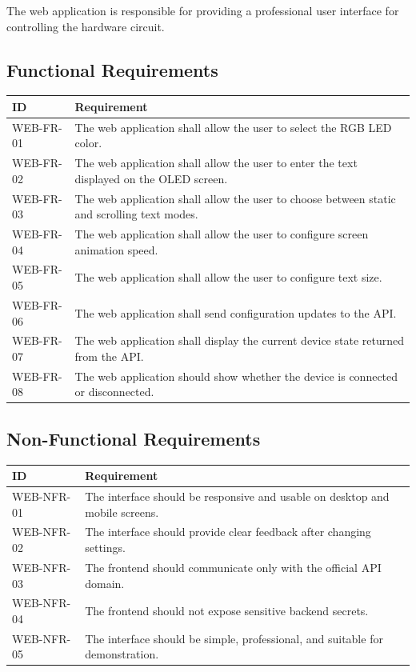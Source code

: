\documentclass[12pt,a4paper]{report}
\begin{document}
The web application is responsible for providing a professional user interface for controlling the hardware circuit.

\subsection{Functional Requirements}

\begin{longtable}{p{2.5cm} p{11cm}}
\toprule
\textbf{ID} & \textbf{Requirement} \\
\midrule
WEB-FR-01 & The web application shall allow the user to select the RGB LED color. \\
WEB-FR-02 & The web application shall allow the user to enter the text displayed on the OLED screen. \\
WEB-FR-03 & The web application shall allow the user to choose between static and scrolling text modes. \\
WEB-FR-04 & The web application shall allow the user to configure screen animation speed. \\
WEB-FR-05 & The web application shall allow the user to configure text size. \\
WEB-FR-06 & The web application shall send configuration updates to the API. \\
WEB-FR-07 & The web application shall display the current device state returned from the API. \\
WEB-FR-08 & The web application should show whether the device is connected or disconnected. \\
\bottomrule
\end{longtable}

\subsection{Non-Functional Requirements}

\begin{longtable}{p{2.5cm} p{11cm}}
\toprule
\textbf{ID} & \textbf{Requirement} \\
\midrule
WEB-NFR-01 & The interface should be responsive and usable on desktop and mobile screens. \\
WEB-NFR-02 & The interface should provide clear feedback after changing settings. \\
WEB-NFR-03 & The frontend should communicate only with the official API domain. \\
WEB-NFR-04 & The frontend should not expose sensitive backend secrets. \\
WEB-NFR-05 & The interface should be simple, professional, and suitable for demonstration. \\
\bottomrule
\end{longtable}
\end{document}
